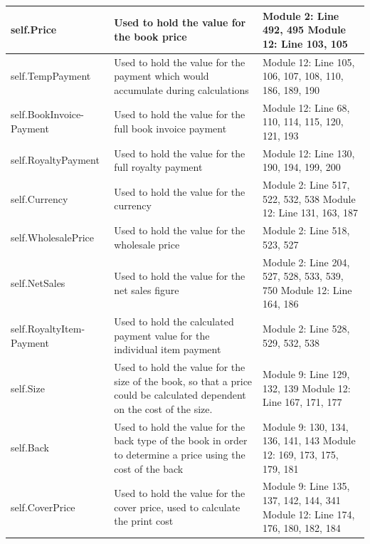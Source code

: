 \begin{center}
\begin{tabular}{|p{3cm}|p{4cm}|p{3cm}|}
    \hline
    self.Price & Used to hold the value for the book price & Module 2: Line 492, 495 \newline Module 12: Line 103, 105 \\ \hline
    self.TempPayment & Used to hold the value for the payment which would accumulate during calculations & Module 12: Line 105, 106, 107, 108, 110, 186, 189, 190 \\ \hline
    self.BookInvoice-Payment & Used to hold the value for the full book invoice payment & Module 12: Line 68, 110, 114, 115, 120, 121, 193 \\ \hline
    self.RoyaltyPayment & Used to hold the value for the full royalty payment & Module 12: Line 130, 190, 194, 199, 200 \\ \hline
    self.Currency & Used to hold the value for the currency & Module 2: Line 517, 522, 532, 538 \newline Module 12: Line 131, 163, 187 \\ \hline
    self.WholesalePrice & Used to hold the value for the wholesale price & Module 2: Line 518, 523, 527 \\ \hline
    self.NetSales & Used to hold the value for the net sales figure & Module 2: Line 204, 527, 528, 533, 539, 750 \newline Module 12: Line 164, 186 \\ \hline
    self.RoyaltyItem-Payment & Used to hold the calculated payment value for the individual item payment & Module 2: Line 528, 529, 532, 538 \\ \hline
    self.Size & Used to hold the value for the size of the book, so that a price could be calculated dependent on the cost of the size. & Module 9: Line 129, 132, 139 \newline Module 12: Line 167, 171, 177 \\  \hline
    self.Back & Used to hold the value for the back type of the book in order to determine a price using the cost of the back & Module 9: 130, 134, 136, 141, 143 \newline Module 12: 169, 173, 175, 179, 181 \\ \hline
    self.CoverPrice & Used to hold the value for the cover price, used to calculate the print cost & Module 9: Line 135, 137, 142, 144, 341 \newline Module 12: Line 174, 176, 180, 182, 184 \\ \hline
    \hline
\end{tabular}
\end{center}

